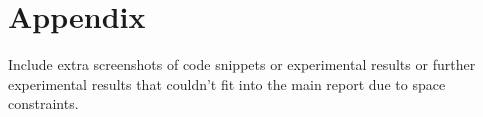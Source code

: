 \documentclass[10pt,twocolumn,letterpaper]{article}
\begin{document}
\appendix

\section{Appendix}
Include extra screenshots of code snippets or experimental results or further experimental results that couldn’t fit into the main report due to space constraints.
\end{document}
